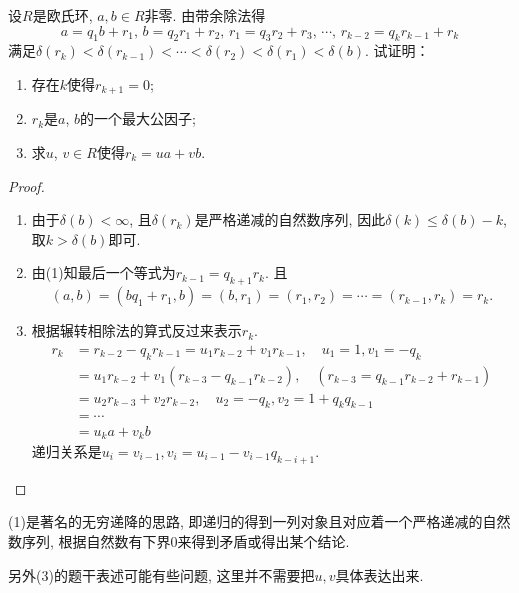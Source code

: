 \begin{problem}[辗转相除法]
    设$R$是欧氏环, $a, b \in R$非零. 由带余除法得
\[
a = q_{1}b + r_{1},\,
b = q_{2}r_{1}+ r_{2},\,
r_{1} = q_{3}r_{2} + r_{3},\, \cdots,\,
r_{k- 2}= q_{k}r_{k- 1}+ r_{k}
\]
满足$\delta(r_k) < \delta(r_{k - 1}) < \cdots < \delta(r_2) < \delta(r_1) < \delta(b)$.
试证明：
\begin{enumerate}[(1)]
    \item 存在$k$使得$r_{k + 1} = 0$;
    \item $r_k$是$a$, $b$的一个最大公因子;
    \item 求$u$, $v \in R$使得$r_k = ua + vb$.
\end{enumerate}
\end{problem}

\begin{proof}
\begin{enumerate}[(1)]
    \item 由于$\delta(b) < \infty$, 且$\delta(r_k)$是严格递减的自然数序列, 因此$\delta(k) \leqslant \delta(b) - k$, 取$k > \delta(b)$即可.
    \item 由(1)知最后一个等式为$r_{k - 1} = q_{k + 1}r_{k}$. 且
\[
    (a, b) = (bq_1 + r_1, b) = (b, r_1) = (r_1, r_2) = \cdots = (r_{k - 1}, r_k) = r_k.
\]
    \item 根据辗转相除法的算式反过来表示$r_k$.
\[
    \begin{aligned}
        r_k &= r_{k - 2} - q_kr_{k - 1} = u_1r_{k - 2} + v_1r_{k - 1},\quad u_1 = 1, v_1 = -q_k\\ 
        &= u_1r_{k - 2} + v_1(r_{k - 3} - q_{k - 1}r_{k - 2}),\quad (r_{k - 3} = q_{k - 1}r_{k - 2} + r_{k - 1})\\
        &= u_2r_{k - 3} + v_2r_{k - 2}, \quad u_2 = -q_k, v_2 = 1 + q_kq_{k - 1}\\
        &= \cdots \\
        &= u_ka + v_kb 
    \end{aligned}
\]
递归关系是$u_i = v_{i - 1}, v_i = u_{i - 1} - v_{i - 1}q_{k - i + 1}$.
\end{enumerate}
\end{proof}

\begin{remark}
    (1)是著名的无穷递降的思路, 即递归的得到一列对象且对应着一个严格递减的自然数序列, 根据自然数有下界$0$来得到矛盾或得出某个结论.

    另外(3)的题干表述可能有些问题, 这里并不需要把$u, v$具体表达出来.
\end{remark}

